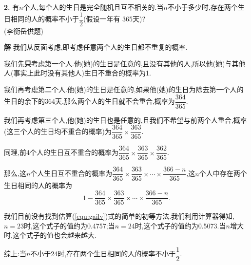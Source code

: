\documentclass{article}
\begin{document}
\par\textbf{2.}{
	有$n$个人,每个人的生日是完全随机且互不相关的.当$n$不小于多少时,存在两个生日相同的人的概率不小于$\dfrac{1}{2}$(假设一年有 365天)?\\
	(李衡岳供题)
}
\par\textbf{解}\quad %
我们从反面考虑,即考虑任意两个人的生日都不重复的概率.
\par 我们先\textbf{只}考虑第一个人.他(她)的生日是任意的,且没有其他的人,所以他(她)与其他人(事实上此时没有其他人)生日不重合的概率为1.
\par 我们再考虑第二个人.他(她)的生日是任意的,如果他(她)的生日为除去第一个人的生日的余下的364天,那么两个人的生日就不会重合,概率为$\dfrac{364}{365}$.
\par 我们再考虑第三个人,他(她)的生日也是任意的,且我们不希望与前两个人重合,概率(这三个人的生日均不重合的概率)为$\dfrac{364}{365} \times\dfrac{363}{365}$.
\par 同理,前4个人的生日互不重合的概率为$\dfrac{364}{365}\times \dfrac{363}{365}\times\dfrac{362}{365}$.
\par 那么,这$n$个人生日互不重合的概率为$\dfrac{364}{365}\times \dfrac{363}{365}\times\cdots\times\dfrac{366-n}{365}$,这$n$个人中存在两个生日相同的人的概率为
\begin{equation}\label{equ:gailv}
1-\dfrac{364}{365}\times\dfrac{363}{365}\times\cdots\times\dfrac{366-n}{365}.	
\end{equation}
\par 我们目前没有找到估算(\ref{equ:gailv})式的简单的初等方法.我们利用计算器得知,$n=23$时,这个式子的值约为0.4757;当$n=24$时,这个式子的值约为0.5073.当$n$增大时,这个式子的值也会越来越大.
\par 综上:当$n$不小于24时,存在两个生日相同的人的概率不小于$\dfrac{1}{2}$.
\end{document}
